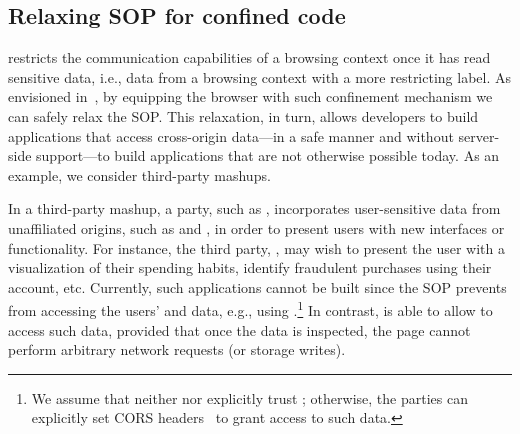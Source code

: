 \subsection{Relaxing SOP for confined code}
\label{sec:system:mashup}
%
\sys{} restricts the communication capabilities of a browsing context
once it has read sensitive data, i.e., data from a browsing context
with a more restricting label.
%
As envisioned in~\cite{yang:2013:towards}, by equipping the browser with such
confinement mechanism we can safely relax the SOP.
%
This relaxation, in turn, allows developers to build applications that access
cross-origin data---in a safe manner and without server-side support---to build
applications that are not otherwise possible today.
%
As an example, we consider third-party mashups.

In a third-party mashup, a party, such as ,
incorporates user-sensitive data from unaffiliated origins, such as
 and , in order to present users with new
interfaces or functionality.
%
For instance, the third party, , may wish to present the user with a
visualization of their spending habits, identify fraudulent
 purchases using their  account, etc.
%
Currently, such applications cannot be built since the SOP prevents
 from accessing the users'  and
 data, e.g., using \xhr{}.\footnote{
 We assume that neither  nor 
 explicitly trust ; otherwise, the parties can
 explicitly set CORS headers~\cite{cors13} to grant 
 access to such data.
}
%
In contrast, \sys{} is able to allow  to access such
data, provided that once the data is inspected, the page cannot
perform arbitrary network requests (or storage writes).
 
